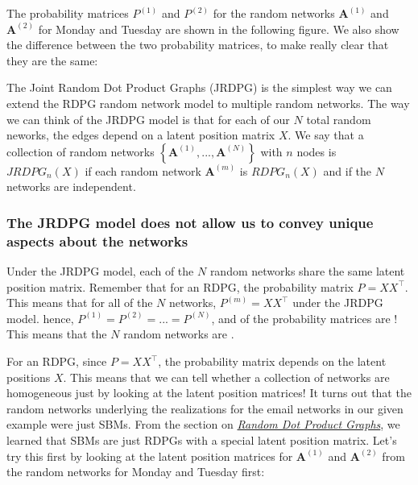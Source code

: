 \documentclass[letterpaper,10pt,english]{jupyterBook}
\begin{document}
\sphinxAtStartPar
The probability matrices \(P^{(1)}\) and \(P^{(2)}\) for the random networks \(\mathbf A^{(1)}\) and \(\mathbf A^{(2)}\) for Monday and Tuesday are shown in the following figure. We also show the difference between the two probability matrices, to make really clear that they are the same:

\noindent{}

\sphinxAtStartPar
The Joint Random Dot Product Graphs (JRDPG) is the simplest way we can extend the RDPG random network model to multiple random networks. The way we can think of the JRDPG model is that for each of our \(N\) total random neworks, the edges depend on a latent position matrix \(X\). We say that a collection of random networks \(\left\{\mathbf A^{(1)}, ..., \mathbf A^{(N)}\right\}\) with \(n\) nodes is \(JRDPG_n(X)\) if each random network \(\mathbf A^{(m)}\) is \(RDPG_n(X)\) and if the \(N\) networks are independent.


\subsubsection{The JRDPG model does not allow us to convey unique aspects about the networks}
\label{\detokenize{representations/ch5/multi-network-models:the-jrdpg-model-does-not-allow-us-to-convey-unique-aspects-about-the-networks}}
\sphinxAtStartPar
Under the JRDPG model, each of the \(N\) random networks share the same latent position matrix. Remember that for an RDPG, the probability matrix \(P = XX^\top\). This means that for all of the \(N\) networks, \(P^{(m)} = XX^\top\) under the JRDPG model. hence, \(P^{(1)} = P^{(2)} = ... = P^{(N)}\), and  of the probability matrices are ! This means that the \(N\) random networks are .

\sphinxAtStartPar
For an RDPG, since \(P = XX^\top\), the probability matrix depends  on the latent positions \(X\). This means that we can tell whether a collection of networks are homogeneous just by looking at the latent position matrices! It turns out that the random networks underlying the realizations for the email networks in our given example were just SBMs. From the section on {\hyperref[\detokenize{representations/ch5/multi-network-models:link?}]{\emph{Random Dot Product Graphs}}}, we learned that SBMs are just RDPGs with a special latent position matrix. Let’s try this first by looking at the latent position matrices for \(\mathbf A^{(1)}\) and \(\mathbf A^{(2)}\) from the random networks for Monday and Tuesday first:
\end{document}
